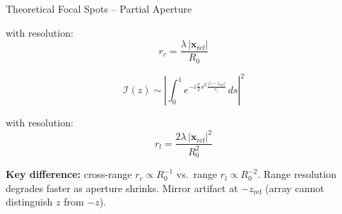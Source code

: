 \documentclass{beamer}
\begin{document}
\begin{frame}{Theoretical Focal Spots -- Partial Aperture}
\begin{minipage}[t]{0.48\textwidth}
\begin{tcolorbox}[stressbox, title=Cross-range ($x$), top=2pt, bottom=2pt]
      with resolution:
      \vspace{-0.1cm}
      $$r_c = \frac{\lambda\,|\bm{x}_{\mathrm{ref}}|}{R_0}$$
    \end{tcolorbox}
  \end{minipage}
  \hfill
  \begin{minipage}[t]{0.48\textwidth}
    \begin{tcolorbox}[stressbox, title=Range ($z$), top=2pt, bottom=2pt]
      \scriptsize
      $$\mathcal{I}(z) \sim \left|\!\int_0^1\!\! e^{-i\frac{\pi}{2}s^2\frac{|z-z_{\mathrm{ref}}|}{r_l}}\,ds\right|^2$$
      \vspace{-0.25cm}

      with resolution:
      \vspace{-0.1cm}
      $$r_l = \frac{2\lambda\,|\bm{x}_{\mathrm{ref}}|^2}{R_0^2}$$
    \end{tcolorbox}
  \end{minipage}

  \vspace{-0.05cm}
  \begin{tcolorbox}[warnbox, top=2pt, bottom=2pt]
    \scriptsize
    \textbf{Key difference:} cross-range $r_c \propto R_0^{-1}$ vs.\ range $r_l \propto R_0^{-2}$. Range resolution degrades faster as aperture shrinks. Mirror artifact at $-z_{\mathrm{ref}}$ (array cannot distinguish $z$ from $-z$).
  \end{tcolorbox}
\end{frame}


\end{document}
